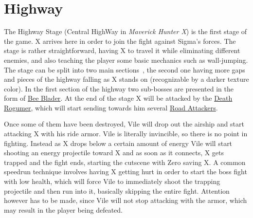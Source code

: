 \section{Highway}
The Highway Stage (Central HighWay in \textit{Maverick Hunter X}) is the first stage of the game. X arrives here in order to join the fight against Sigma's forces.
The stage is rather straightforward, having X to travel it while eliminating different enemies, and also teaching the player some basic mechanics such as wall-jumping.  The stage can be split into two main sections~\cite{stratwiki:HighWay}, the second one having more gaps and pieces of the highway falling as X stands on (recognizable by a darker texture color). In the first section of the highway two sub-bosses are presented in the form of \hyperlink{miniboss:Bee_Blader}{Bee Blader}. At the end of the stage X will be attacked by the \hyperlink{vehicle:Death_Rogumer}{Death Rogumer}, which will start sending towards him several \hyperlink{enem:Road_Attackers}{Road Attackers}.


Once some of them have been destroyed, Vile will drop out the airship and start attacking X with his ride armor. Vile is literally invincible, so there is 
no point in fighting. Instead as X drops below a certain amount of energy Vile will start shooting an energy projectile toward X and as soon as it connects, X gets trapped and the fight ends, starting the cutscene with Zero saving X. A common speedrun  technique involves having X getting hurt in order to start the boss fight with low health, which will force Vile to immediately shoot the trapping projectile and then run into it, basically skipping the entire fight.  Attention however has to be made, since Vile will not stop attacking with the armor, which may result in the player being defeated.

